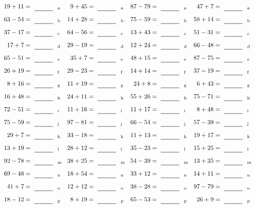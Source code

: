 \documentclass
[
  draft    = true,
  fontsize = 11pt,
  parskip  = half-
]
{scrartcl}
\begin{document}
\clearpage
\begin{align*}
    \pline{19+11}&=\rline{a}
  & \pline{9+45}&=\rline{a}
  & \pline{87-79}&=\rline{a}
  & \pline{47+7}&=\rline{a} \\[1ex]
    \pline{63-54}&=\rline{b}
  & \pline{14+28}&=\rline{b}
  & \pline{75-59}&=\rline{b}
  & \pline{58+14}&=\rline{b} \\[1ex]
    \pline{37-17}&=\rline{c}
  & \pline{64-56}&=\rline{c}
  & \pline{13+43}&=\rline{c}
  & \pline{51-31}&=\rline{c} \\[1ex]
    \pline{17+7}&=\rline{d}
  & \pline{29-19}&=\rline{d}
  & \pline{12+24}&=\rline{d}
  & \pline{66-48}&=\rline{d} \\[1ex]
    \pline{65-51}&=\rline{e}
  & \pline{35+7}&=\rline{e}
  & \pline{48+15}&=\rline{e}
  & \pline{87-75}&=\rline{e} \\[1ex]
    \pline{26+19}&=\rline{f}
  & \pline{29-23}&=\rline{f}
  & \pline{14+14}&=\rline{f}
  & \pline{37-19}&=\rline{f} \\[1ex]
    \pline{8+16}&=\rline{g}
  & \pline{11+19}&=\rline{g}
  & \pline{24+8}&=\rline{g}
  & \pline{6+43}&=\rline{g} \\[1ex]
    \pline{16+48}&=\rline{h}
  & \pline{24+11}&=\rline{h}
  & \pline{55+26}&=\rline{h}
  & \pline{75-71}&=\rline{h} \\[1ex]
    \pline{72-51}&=\rline{i}
  & \pline{11+16}&=\rline{i}
  & \pline{11+17}&=\rline{i}
  & \pline{8+48}&=\rline{i} \\[1ex]
    \pline{75-59}&=\rline{j}
  & \pline{97-81}&=\rline{j}
  & \pline{66-54}&=\rline{j}
  & \pline{57-39}&=\rline{j} \\[1ex]
    \pline{29+7}&=\rline{k}
  & \pline{33-18}&=\rline{k}
  & \pline{11+13}&=\rline{k}
  & \pline{19+17}&=\rline{k} \\[1ex]
    \pline{13+19}&=\rline{l}
  & \pline{28+12}&=\rline{l}
  & \pline{35-23}&=\rline{l}
  & \pline{15+25}&=\rline{l} \\[1ex]
    \pline{92-78}&=\rline{m}
  & \pline{38+25}&=\rline{m}
  & \pline{54-39}&=\rline{m}
  & \pline{13+35}&=\rline{m} \\[1ex]
    \pline{69-48}&=\rline{n}
  & \pline{18+54}&=\rline{n}
  & \pline{33+12}&=\rline{n}
  & \pline{14+11}&=\rline{n} \\[1ex]
    \pline{41+7}&=\rline{o}
  & \pline{12+12}&=\rline{o}
  & \pline{38-28}&=\rline{o}
  & \pline{97-79}&=\rline{o} \\[1ex]
    \pline{18-12}&=\rline{p}
  & \pline{8+19}&=\rline{p}
  & \pline{65-53}&=\rline{p}
  & \pline{26+9}&=\rline{p}
\end{align*}
\end{document}
